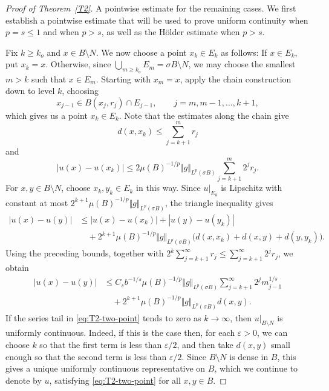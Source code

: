 \documentclass[12pt,leqno]{amsart}
\theoremstyle{definition}
\numberwithin{theorem}{section} \numberwithin{equation}{section}
\begin{document}
\begin{proof}[Proof of Theorem~\ref{T2}]
\medskip
\noindent
{\sc A pointwise estimate for the remaining cases.}
We first establish a pointwise estimate that will be used to prove uniform
continuity when $p=s\leq1$ and when $p>s$, as well as the H\"older
estimate when $p>s$.

Fix $k\geq k_o$ and $x\in B\setminus N$. 
We now choose a point $x_k\in E_k$ as follows:
If $x\in E_k$, put $x_k=x$.
Otherwise, since $\bigcup_{m\geq k_o}E_m=\sigma B\setminus N$,
we may choose the smallest $m>k$ such that $x\in E_m$. Starting with $x_m=x$,
apply the chain construction down to level $k$, choosing
\[
 x_{j-1}\in B(x_j,r_j)\cap E_{j-1},
 \qquad j=m,m-1,\ldots,k+1,
\]
which gives us a point $x_k\in E_k$. Note that the estimates along the chain give
\[
 d(x,x_k)\leq\sum_{j=k+1}^m r_j
\]
and
\[
 |u(x)-u(x_k)|
 \leq 2\mu(B)^{-1/p}\Vert g\Vert_{L^p(\sigma B)}
       \sum_{j=k+1}^m2^jr_j.
\]
For $x,y\in B\setminus N$, choose $x_k,y_k\in E_k$ in this way.
Since $u|_{E_k}$ is Lipschitz with constant at most
$2^{k+1}\mu(B)^{-1/p}\Vert g\Vert_{L^p(\sigma B)}$, the triangle
inequality gives
\[
\begin{split}
 |u(x)-u(y)|
 &\leq |u(x)-u(x_k)|+|u(y)-u(y_k)|\\
 &\quad+2^{k+1}\mu(B)^{-1/p}\Vert g\Vert_{L^p(\sigma B)}
 \bigl(d(x,x_k)+d(x,y)+d(y,y_k)\bigr).
\end{split}
\]
Using the preceding bounds, together with
$2^k\sum_{j=k+1}^{\infty}r_j\leq\sum_{j=k+1}^{\infty}2^jr_j$, we obtain
\begin{equation}
\label{eq:T2-two-point}
\begin{split}
 |u(x)-u(y)|
 &\leq C_s b^{-1/s}\mu(B)^{-1/p}\Vert g\Vert_{L^p(\sigma B)}
       \sum_{j=k+1}^{\infty}2^jm_{j-1}^{1/s}\\
 &\quad+2^{k+1}\mu(B)^{-1/p}\Vert g\Vert_{L^p(\sigma B)}d(x,y).
\end{split}
\end{equation}
If the series tail in \eqref{eq:T2-two-point} tends to zero as
$k\to\infty$, then $u|_{B\setminus N}$ is uniformly continuous.
Indeed, if this is the case then, for each $\varepsilon>0$, we can choose $k$ so that the first term is less than $\varepsilon/2$, and then take $d(x,y)$ small enough so that the second term is less than $\varepsilon/2$. Since $B\setminus N$ is dense in $B$, this gives a unique uniformly continuous representative on $B$, which we continue to denote by $u$, satisfying \eqref{eq:T2-two-point} for all $x,y\in B$.



\end{proof}
\end{document}
